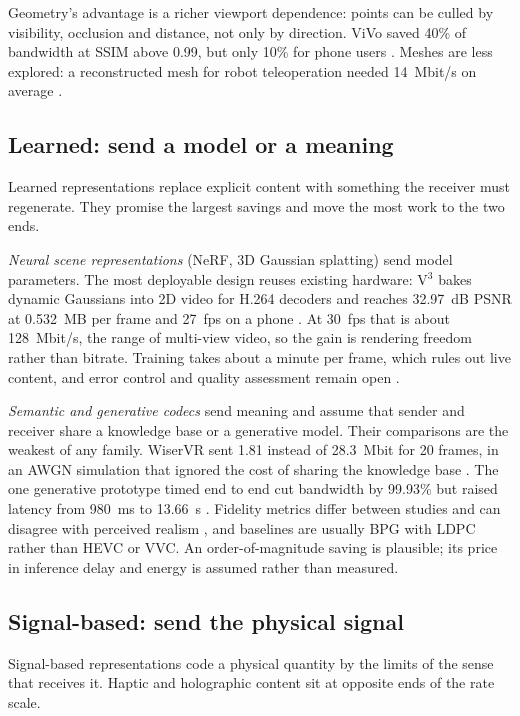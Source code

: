 Geometry's advantage is a richer viewport dependence: points can be culled by visibility, occlusion and
distance, not only by direction. ViVo saved 40\% of bandwidth at SSIM above 0.99, but only
10\% for phone users \cite{W3021314748}. Meshes are less explored: a reconstructed mesh for robot teleoperation needed
14~Mbit/s on average \cite{W2966611292}.

\subsection{Learned: send a model or a meaning}
Learned representations replace explicit content with something the receiver must regenerate. They
promise the largest savings and move the most work to the two ends.

\emph{Neural scene representations} (NeRF, 3D Gaussian splatting) send model parameters. The most
deployable design reuses existing hardware: V$^3$ bakes dynamic Gaussians into 2D video for H.264
decoders and reaches 32.97~dB PSNR at 0.532~MB per frame and 27~fps on a phone \cite{W4404525293}. At
30~fps that is about 128~Mbit/s, the range of multi-view video, so the gain is rendering freedom rather
than bitrate. Training takes about a minute per frame, which rules out live content, and error control and
quality assessment remain open \cite{W4408847683}.

\emph{Semantic and generative codecs} send meaning and assume that sender and receiver share a knowledge
base or a generative model. Their comparisons are the weakest of any family. WiserVR sent
1.81 instead of 28.3~Mbit for 20 frames, in an AWGN simulation that ignored the cost of sharing the
knowledge base \cite{W4324296656}. The one generative prototype timed end to end cut bandwidth by
99.93\% but raised latency from 980~ms to 13.66~s \cite{W4403677254}. Fidelity metrics differ between
studies and can disagree with perceived realism \cite{W4385452934}, and baselines are usually BPG with
LDPC rather than HEVC or VVC. An order-of-magnitude saving is plausible; its price in inference delay
and energy is assumed rather than measured.

\subsection{Signal-based: send the physical signal}
Signal-based representations code a physical quantity by the limits of the sense that receives it.
Haptic and holographic content sit at opposite ends of the rate scale.

